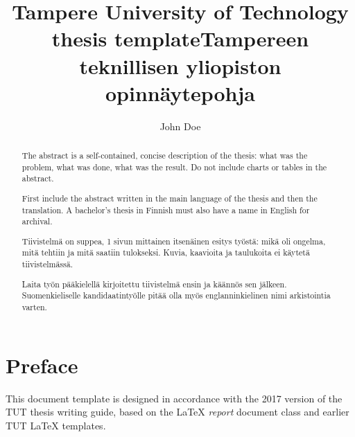 \documentclass[twoside,draftfooter]{tutthesis} %
\author{John Doe}
\title{Tampere University of Technology thesis template}
\begin{document}
\maketitle



\begin{abstract}
The abstract is a self-contained, concise description of the thesis: what was the problem, what was done, what was the result.
Do not include charts or tables in the abstract.

First include the abstract written in the main language of the thesis and then the translation.
A bachelor's thesis in Finnish must also have a name in English for archival.
\end{abstract}


\begin{otherlanguage}{finnish}

\title{Tampereen teknillisen yliopiston opinnäytepohja}

\begin{abstract}
Tiivistelmä on suppea, 1 sivun mittainen itsenäinen esitys työstä: mikä oli ongelma, mitä tehtiin ja mitä saatiin tulokseksi.
Kuvia, kaavioita ja taulukoita ei käytetä tiivistelmässä.

Laita työn pääkielellä kirjoitettu tiivistelmä ensin ja käännös sen jälkeen.
Suomenkieliselle kandidaatintyölle pitää olla myös englanninkielinen nimi arkistointia varten.
\end{abstract}
\end{otherlanguage}



\chapter*{Preface}

This document template is designed in accordance with the 2017 version of the TUT thesis writing guide, based on the LaTeX \emph{report} document class and earlier TUT LaTeX templates.
\end{document}
